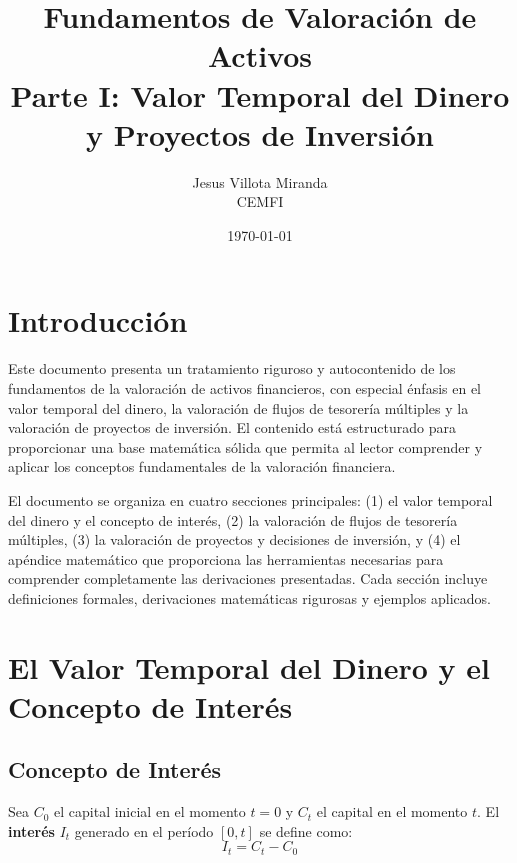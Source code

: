 

\title{\textbf{Fundamentos de Valoración de Activos}\\
\large Parte I: Valor Temporal del Dinero y Proyectos de Inversión}
\author{Jesus Villota Miranda\\
CEMFI}
\date{\today}



\maketitle

\tableofcontents
\newpage

\section{Introducción}

Este documento presenta un tratamiento riguroso y autocontenido de los fundamentos de la valoración de activos financieros, con especial énfasis en el valor temporal del dinero, la valoración de flujos de tesorería múltiples y la valoración de proyectos de inversión. El contenido está estructurado para proporcionar una base matemática sólida que permita al lector comprender y aplicar los conceptos fundamentales de la valoración financiera.

El documento se organiza en cuatro secciones principales: (1) el valor temporal del dinero y el concepto de interés, (2) la valoración de flujos de tesorería múltiples, (3) la valoración de proyectos y decisiones de inversión, y (4) el apéndice matemático que proporciona las herramientas necesarias para comprender completamente las derivaciones presentadas. Cada sección incluye definiciones formales, derivaciones matemáticas rigurosas y ejemplos aplicados.

\section{El Valor Temporal del Dinero y el Concepto de Interés}

\subsection{Concepto de Interés}

\begin{definicion}[Interés]
Sea $C_0$ el capital inicial en el momento $t=0$ y $C_t$ el capital en el momento $t$. El \textbf{interés} $I_t$ generado en el período $[0,t]$ se define como:
\begin{equation}
I_t = C_t - C_0
\end{equation}
\end{definicion}

